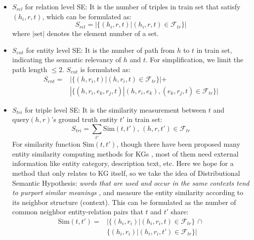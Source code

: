 \documentclass[letterpaper]{article} \usepackage{aaai22}  \usepackage{times}  \usepackage{helvet}  \usepackage{courier}  \usepackage[hyphens]{url}  \usepackage{graphicx} \urlstyle{rm} \def\UrlFont{\rm}  \usepackage{natbib}  \usepackage{caption} \DeclareCaptionStyle{ruled}{labelfont=normalfont,labelsep=colon,strut=off} \frenchspacing  \setlength{\pdfpagewidth}{8.5in}  \setlength{\pdfpageheight}{11in}  \usepackage{algorithm}
\begin{document}
\begin{itemize}
    \item $S_{rel}$ for relation level SE: It is the number of triples in train set that satisfy $(h_i, r, t)$, which can be formulated as: 
    $$
    S_{rel}=|\{(h_i, r, t) | (h_i, r, t) \in \mathcal{F}_{tr}\}|
    $$ 
    where $|\mathrm{set}|$ denotes the element number of a set. 
    \item $S_{ent}$ for entity level SE: It is the number of path from $h$ to $t$ in train set, indicating the semantic relevancy of $h$ and $t$. For simplification, we limit the path length $\leq 2$. $S_{ent}$ is formulated as:
    \begin{align*}
        S_{ent} =& |\{(h, r_i, t) | (h, r_i, t) \in \mathcal{F}_{tr}\}| + \\
        & |\{(h, r_i, e_k, r_j, t) | (h, r_i, e_k), (e_k, r_j, t) \in \mathcal{F}_{tr}\}|
    \end{align*} 
    \item $S_{tri}$ for triple level SE: It is the similarity measurement between $t$ and $\mathrm{query}(h, r)$'s ground truth entity $t'$ in train set:  
    $$
    S_{tri} = \sum_{t'} \mathrm{Sim}(t, t'), \, (h, r, t') \in \mathcal{F}_{tr}
    $$
    For similarity function $\mathrm{Sim}(t, t')$, though there have been proposed many entity similarity computing methods for KGs \cite{IKDD_2015_Choudhury_SimCat, TKDE_2017_Zhu_Concept, IEEE_2018_Sun_Topic_Sim}, most of them need external information like entity category, description text, etc. Here we hope for a method that only relates to KG itself, so we take the idea of Distributional Semantic Hypothesis: \textit{words that are used and occur in the same contexts tend to purport similar meanings} \cite{1954_Harris_Distribution}, and measure the entity similarity according to its neighbor structure (context). 
    This can be formulated as the number of common neighbor entity-relation pairs that $t$ and $t'$ share:
    \begin{align*}
        \mathrm{Sim}(t, t') = & \left| \{(h_i, r_i)| (h_i, r_i, t) \in \mathcal{F}_{tr}\} \, \cap \right. \\
        & \left. \{(h_i, r_i)| (h_i, r_i, t') \in \mathcal{F}_{tr}\} \right|
    \end{align*}
\end{itemize}
\end{document}
